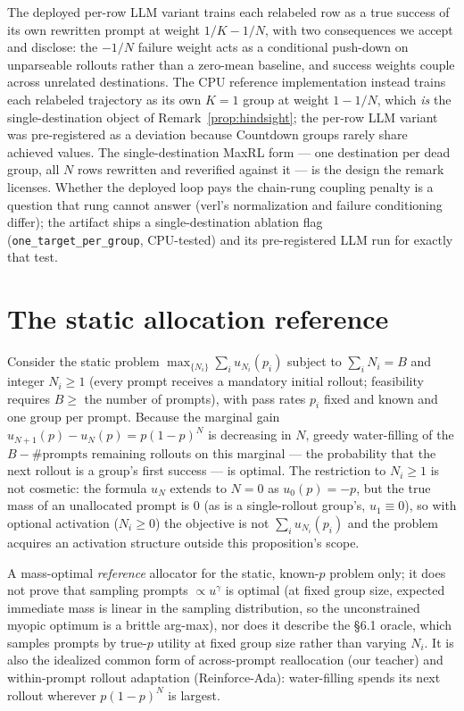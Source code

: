 The deployed per-row LLM variant trains each relabeled row as a true
success of its own rewritten prompt at weight $1/K - 1/N$, with two
consequences we accept and disclose: the $-1/N$ failure weight acts as
a conditional push-down on unparseable rollouts rather than a
zero-mean baseline, and success weights couple across unrelated
destinations. The CPU reference implementation instead trains each
relabeled trajectory as its own $K{=}1$ group at weight $1 - 1/N$,
which \emph{is} the single-destination object of
Remark~\ref{prop:hindsight}; the per-row LLM variant was
pre-registered as a deviation because Countdown groups rarely share
achieved values. The single-destination MaxRL form --- one destination
per dead group, all $N$ rows rewritten and reverified against it ---
is the design the remark licenses. Whether the deployed loop pays the
chain-rung coupling penalty is a question that rung cannot answer
(verl's normalization and failure conditioning differ); the artifact
ships a single-destination ablation flag
(\texttt{one\_target\_per\_group}, CPU-tested) and its pre-registered
LLM run for exactly that test.

\section{The static allocation reference}\label{app:alloc}

\begin{proposition}\label{prop:alloc}
Consider the static problem
$\max_{\{N_i\}} \sum_i u_{N_i}(p_i)$ subject to $\sum_i N_i = B$ and
integer $N_i \ge 1$ (every prompt receives a mandatory initial
rollout; feasibility requires $B \ge$ the number of prompts), with
pass rates $p_i$ fixed and known and one group per prompt. Because
the marginal gain $u_{N+1}(p) - u_N(p) = p(1-p)^N$ is decreasing in
$N$, greedy water-filling of the $B - \#\text{prompts}$ remaining
rollouts on this marginal --- the probability that the next rollout
is a group's first success --- is optimal. The restriction to
$N_i \ge 1$ is not cosmetic: the formula $u_N$ extends to $N{=}0$ as
$u_0(p) = -p$, but the true mass of an unallocated prompt is $0$ (as
is a single-rollout group's, $u_1 \equiv 0$), so with optional
activation ($N_i \ge 0$) the objective is not
$\sum_i u_{N_i}(p_i)$ and the problem acquires an activation
structure outside this proposition's scope.
\end{proposition}
\begin{interp}
A mass-optimal \emph{reference} allocator for the static, known-$p$
problem only; it does not prove that sampling prompts
$\propto u^\gamma$ is optimal (at fixed group size, expected immediate
mass is linear in the sampling distribution, so the unconstrained
myopic optimum is a brittle arg-max), nor does it describe the \S 6.1
oracle, which samples prompts by true-$p$ utility at fixed group size
rather than varying $N_i$. It is also the idealized common form of
across-prompt reallocation (our teacher) and within-prompt rollout
adaptation (Reinforce-Ada): water-filling spends its next rollout
wherever $p(1-p)^N$ is largest.
\end{interp}

